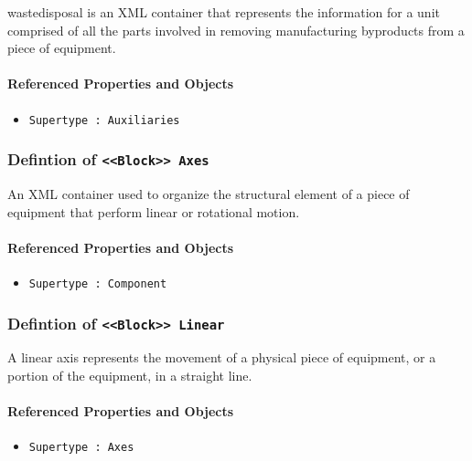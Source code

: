 wastedisposal is an XML container that represents the information for a unit comprised of all the parts involved in removing manufacturing byproducts from a piece of equipment.


\FloatBarrier
\paragraph{Referenced Properties and Objects}

\begin{itemize}
\item \texttt{Supertype : Auxiliaries}

\end{itemize}
\FloatBarrier
\subsubsection{Defintion of \texttt{<<Block>> Axes}}
  \label{type:Axes}

\FloatBarrier

An XML container used to organize the structural element of a piece of equipment that perform linear or rotational motion.

\FloatBarrier
\paragraph{Referenced Properties and Objects}

\begin{itemize}
\item \texttt{Supertype : Component}

\end{itemize}
\FloatBarrier
\subsubsection{Defintion of \texttt{<<Block>> Linear}}
  \label{type:Linear}

\FloatBarrier

A linear axis represents the movement of a physical piece of equipment, or a portion of the equipment, in a straight line. 

\FloatBarrier
\paragraph{Referenced Properties and Objects}

\begin{itemize}
\item \texttt{Supertype : Axes}

\end{itemize}
\FloatBarrier
